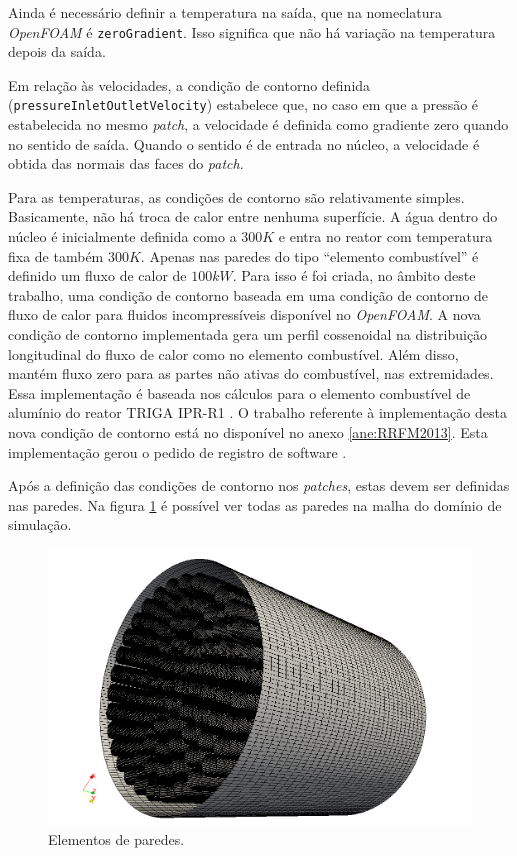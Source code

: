 \documentclass[12pt,openright,twoside,a4paper,english,french,spanish,brazil]{abntex2}
\begin{document}
Ainda é necessário definir a temperatura na saída, que na nomeclatura \textit{OpenFOAM} é \texttt{zeroGradient}. Isso significa que não 
há variação na temperatura depois da saída.

Em relação às velocidades, a condição de contorno definida (\texttt{pressureInletOutletVelocity}) estabelece 
que, no caso em que a pressão é estabelecida no mesmo \textit{patch}, a velocidade é definida como gradiente zero quando no sentido de saída. 
Quando o sentido é de entrada no núcleo, a velocidade é obtida das normais das faces do \textit{patch}.

Para as temperaturas, as condições de contorno são relativamente simples. Basicamente, não há troca de calor entre nenhuma superfície. A água 
dentro do núcleo é inicialmente definida como a $300 K$ e entra no reator com temperatura fixa de também $300 K$. Apenas nas paredes do 
tipo ``elemento combustível'' é definido um fluxo de calor de $100 kW$. Para isso é foi criada, no âmbito deste trabalho, 
uma condição de contorno baseada em uma 
condição de contorno de fluxo de calor para fluidos incompressíveis disponível no \textit{OpenFOAM}. A nova condição de contorno 
implementada \cite{Silva2013} gera um perfil cossenoidal na distribuição longitudinal do fluxo de calor como no elemento combustível. 
Além disso, mantém fluxo zero para as partes não ativas do combustível, nas extremidades. Essa implementação é baseada nos 
cálculos para o elemento combustível de alumínio do reator TRIGA IPR-R1 \cite{Veloso2005}. O trabalho referente à implementação desta nova 
condição de contorno está no disponível no anexo \ref{ane:RRFM2013}. Esta implementação gerou o pedido 
de registro de software \cite{TRIGAfuel2013}.

Após a definição das condições de contorno nos \textit{patches}, estas devem ser definidas nas paredes. 
Na figura \ref{fig:walls} é possível 
ver todas as paredes na malha do domínio de simulação.
\begin{figure}[h]
  \centering\includegraphics[scale=0.5]{figuras/walls2.png}
  \caption{Elementos de paredes.}
  \label{fig:walls}
\end{figure}
\end{document}
